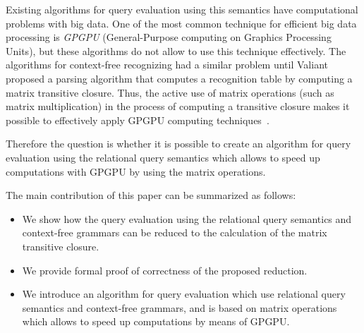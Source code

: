 \documentclass{vldb}
\begin{document}
Existing algorithms for query evaluation using this semantics have computational problems with big data. One of the most common technique for efficient big data processing is \textit{GPGPU} (General-Purpose computing on Graphics Processing Units), but these algorithms do not allow to use this technique effectively. The algorithms for context-free recognizing had a similar problem until Valiant~\cite{valiant} proposed a parsing algorithm that computes a recognition table by computing a matrix transitive closure. Thus, the active use of matrix operations (such as matrix multiplication) in the process of computing a transitive closure makes it possible to effectively apply GPGPU computing techniques~\cite{matricesOnGPGPU}.

 Therefore the question is whether it is possible to create an algorithm for query evaluation using the relational query semantics which allows to speed up computations with GPGPU by using the matrix operations.

The main contribution of this paper can be summarized as follows:
\begin{itemize}
    \item We show how the query evaluation using the relational query semantics and context-free grammars can be reduced to the calculation of the matrix transitive closure.
    \item We provide formal proof of correctness of the proposed reduction.
    \item We introduce an algorithm for query evaluation which use relational query semantics and context-free grammars, and is based on matrix operations which allows to speed up computations by means of GPGPU.
\end{itemize}











\balancecolumns
\end{document}
